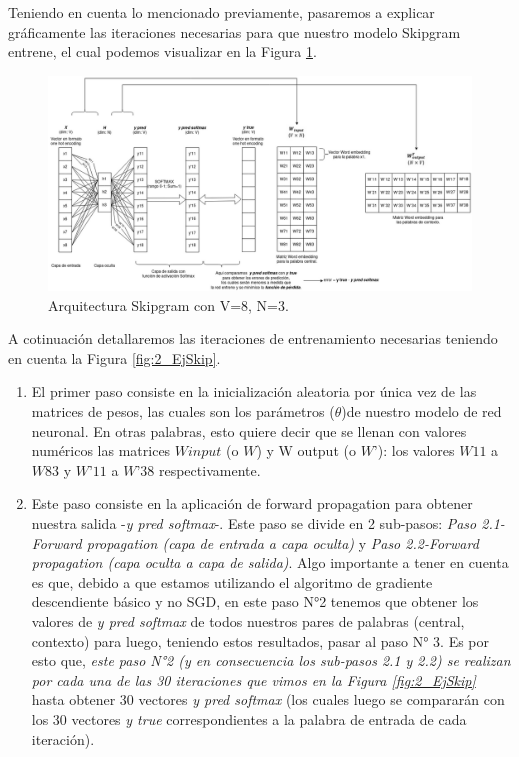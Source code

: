 \documentclass[12pt,a4paper]{article}
\begin{document}
\begin{sloppypar}
Teniendo en cuenta lo mencionado previamente, pasaremos a explicar gráficamente las iteraciones necesarias para que nuestro modelo Skipgram entrene, el cual podemos visualizar en la  Figura \ref{fig:4_EjSkip}.

\begin{figure}[H]    %
\centering
\includegraphics[width=1\textwidth]{images/Ejemplo_Skipgram/4_EjSkip.png}
\caption{Arquitectura Skipgram con V=8, N=3.} 
\label{fig:4_EjSkip}
\end{figure}

A cotinuación detallaremos las iteraciones de entrenamiento necesarias teniendo en cuenta la Figura \ref{fig:2_EjSkip}. 

\begin{enumerate}
      
\item El primer paso consiste en la inicialización aleatoria por única vez de las matrices de pesos, las cuales son los parámetros ($\theta$)de nuestro modelo de red neuronal. En otras palabras, esto quiere decir que se llenan con valores numéricos las matrices $W input$ (o $W$) y W output (o $W’$): los valores $W11$ a $W83$ y $W’11$ a $W’38$ respectivamente.
\item Este paso consiste en la aplicación de forward propagation para obtener nuestra salida -\textit{y pred softmax}-. Este paso se divide en 2 sub-pasos: \textit{Paso 2.1-Forward propagation (capa de entrada a capa oculta)} y \textit{Paso 2.2-Forward propagation (capa oculta a capa de salida)}.
Algo importante a tener en cuenta es que, debido a que estamos utilizando el algoritmo de gradiente descendiente básico y no SGD, en este paso N°2 tenemos que obtener los valores de \textit{y pred softmax} de todos nuestros pares de palabras (central, contexto) para luego, teniendo estos resultados, pasar al paso N° 3. Es por esto que, \textit{este paso N°2 (y en consecuencia los sub-pasos 2.1 y 2.2) se realizan por cada una de las 30 iteraciones que vimos en la Figura \ref{fig:2_EjSkip} } hasta obtener 30 vectores \textit{y pred softmax} (los cuales luego se compararán con los 30 vectores \textit{y true} correspondientes a la palabra de entrada de cada iteración).
      \begin{itemize}
      

\end{itemize}
\end{enumerate}
\end{sloppypar}
\end{document}
